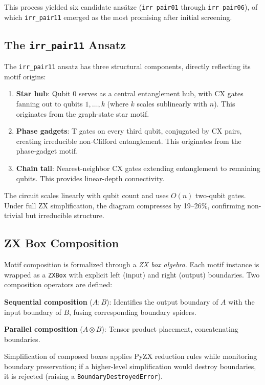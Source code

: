 \documentclass[twocolumn,prl,amsmath,amssymb,superscriptaddress]{revtex4-2}
\begin{document}
This process yielded six candidate ansätze (\texttt{irr\_pair01} through \texttt{irr\_pair06}), of which \texttt{irr\_pair11} emerged as the most promising after initial screening.

\subsection{The \texttt{irr\_pair11} Ansatz}
\label{sec:irr_pair11}

The \texttt{irr\_pair11} ansatz has three structural components, directly reflecting its motif origins:

\begin{enumerate}
    \item \textbf{Star hub}: Qubit 0 serves as a central entanglement hub, with CX gates fanning out to qubits $1, \ldots, k$ (where $k$ scales sublinearly with $n$). This originates from the graph-state star motif.
    \item \textbf{Phase gadgets}: T gates on every third qubit, conjugated by CX pairs, creating irreducible non-Clifford entanglement. This originates from the phase-gadget motif.
    \item \textbf{Chain tail}: Nearest-neighbor CX gates extending entanglement to remaining qubits. This provides linear-depth connectivity.
\end{enumerate}

The circuit scales linearly with qubit count and uses $O(n)$ two-qubit gates.
Under full ZX simplification, the diagram compresses by 19--26\%, confirming non-trivial but irreducible structure.

\subsection{ZX Box Composition}
\label{sec:composition}

Motif composition is formalized through a \emph{ZX box algebra}.
Each motif instance is wrapped as a \texttt{ZXBox} with explicit left (input) and right (output) boundaries.
Two composition operators are defined:

\textbf{Sequential composition} ($A ; B$): Identifies the output boundary of $A$ with the input boundary of $B$, fusing corresponding boundary spiders.

\textbf{Parallel composition} ($A \otimes B$): Tensor product placement, concatenating boundaries.

Simplification of composed boxes applies PyZX reduction rules while monitoring boundary preservation; if a higher-level simplification would destroy boundaries, it is rejected (raising a \texttt{BoundaryDestroyedError}).
\end{document}
